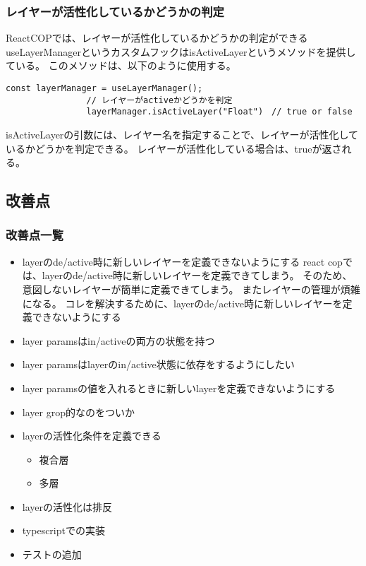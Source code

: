 \documentclass{jsarticle}
\begin{document}
    \subsubsection{レイヤーが活性化しているかどうかの判定}
        ReactCOPでは、レイヤーが活性化しているかどうかの判定ができるuseLayerManagerというカスタムフックはisActiveLayerというメソッドを提供している。
        このメソッドは、以下のように使用する。
        \begin{lstlisting}[]
                const layerManager = useLayerManager();
                // レイヤーがactiveかどうかを判定
                layerManager.isActiveLayer("Float")　// true or false
        \end{lstlisting}
        isActiveLayerの引数には、レイヤー名を指定することで、レイヤーが活性化しているかどうかを判定できる。
        レイヤーが活性化している場合は、trueが返される。
    \subsection{改善点}

    \subsubsection{改善点一覧}

    \begin{itemize}
    \item layerのde/active時に新しいレイヤーを定義できないようにする
    react copでは、layerのde/active時に新しいレイヤーを定義できてしまう。
    そのため、意図しないレイヤーが簡単に定義できてしまう。
    またレイヤーの管理が煩雑になる。
    コレを解決するために、layerのde/active時に新しいレイヤーを定義できないようにする
    \item layer paramsはin/activeの両方の状態を持つ
    \item layer paramsはlayerのin/active状態に依存をするようにしたい
    \item layer paramsの値を入れるときに新しいlayerを定義できないようにする
    \item layer grop的なのをついか
    \item layerの活性化条件を定義できる
    \begin{itemize}
    \item 複合層
    \item 多層
    \end{itemize}
    \item layerの活性化は排反
    \item typescriptでの実装
    \item テストの追加
    \end{itemize}
\end{document}
